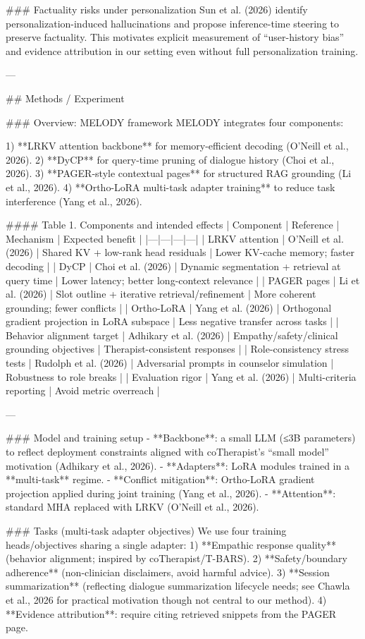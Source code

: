 ### Factuality risks under personalization  
Sun et al. (2026) identify personalization-induced hallucinations and propose inference-time steering to preserve factuality. This motivates explicit measurement of “user-history bias” and evidence attribution in our setting even without full personalization training.

---

## Methods / Experiment  

### Overview: MELODY framework  
MELODY integrates four components:

1) **LRKV attention backbone** for memory-efficient decoding (O’Neill et al., 2026).  
2) **DyCP** for query-time pruning of dialogue history (Choi et al., 2026).  
3) **PAGER-style contextual pages** for structured RAG grounding (Li et al., 2026).  
4) **Ortho-LoRA multi-task adapter training** to reduce task interference (Yang et al., 2026).

#### Table 1. Components and intended effects
| Component | Reference | Mechanism | Expected benefit |
|---|---|---|---|
| LRKV attention | O’Neill et al. (2026) | Shared KV + low-rank head residuals | Lower KV-cache memory; faster decoding |
| DyCP | Choi et al. (2026) | Dynamic segmentation + retrieval at query time | Lower latency; better long-context relevance |
| PAGER pages | Li et al. (2026) | Slot outline + iterative retrieval/refinement | More coherent grounding; fewer conflicts |
| Ortho-LoRA | Yang et al. (2026) | Orthogonal gradient projection in LoRA subspace | Less negative transfer across tasks |
| Behavior alignment target | Adhikary et al. (2026) | Empathy/safety/clinical grounding objectives | Therapist-consistent responses |
| Role-consistency stress tests | Rudolph et al. (2026) | Adversarial prompts in counselor simulation | Robustness to role breaks |
| Evaluation rigor | Yang et al. (2026) | Multi-criteria reporting | Avoid metric overreach |

---

### Model and training setup  
- **Backbone**: a small LLM (≤3B parameters) to reflect deployment constraints aligned with coTherapist’s “small model” motivation (Adhikary et al., 2026).  
- **Adapters**: LoRA modules trained in a **multi-task** regime.  
- **Conflict mitigation**: Ortho-LoRA gradient projection applied during joint training (Yang et al., 2026).  
- **Attention**: standard MHA replaced with LRKV (O’Neill et al., 2026).  

### Tasks (multi-task adapter objectives)  
We use four training heads/objectives sharing a single adapter:  
1) **Empathic response quality** (behavior alignment; inspired by coTherapist/T-BARS).  
2) **Safety/boundary adherence** (non-clinician disclaimers, avoid harmful advice).  
3) **Session summarization** (reflecting dialogue summarization lifecycle needs; see Chawla et al., 2026 for practical motivation though not central to our method).  
4) **Evidence attribution**: require citing retrieved snippets from the PAGER page.

